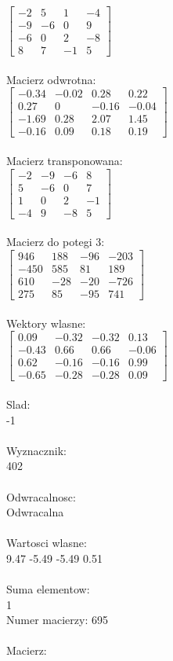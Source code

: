 \documentclass[a4paper,12pt]{article}
\begin{document}
$\begin{bmatrix} -2&5&1&-4\\-9&-6&0&9\\-6&0&2&-8\\8&7&-1&5 \end{bmatrix}$
\\
\\
Macierz odwrotna:\\

$\begin{bmatrix} -0.34&-0.02&0.28&0.22\\0.27&0&-0.16&-0.04\\-1.69&0.28&2.07&1.45\\-0.16&0.09&0.18&0.19 \end{bmatrix}$
\\
\\
Macierz transponowana:\\

$\begin{bmatrix} -2&-9&-6&8\\5&-6&0&7\\1&0&2&-1\\-4&9&-8&5 \end{bmatrix}$
\\
\\
Macierz do potegi 3:\\

$\begin{bmatrix} 946&188&-96&-203\\-450&585&81&189\\610&-28&-20&-726\\275&85&-95&741 \end{bmatrix}$
\\
\\
Wektory wlasne:\\

$\begin{bmatrix} 0.09&-0.32&-0.32&0.13\\-0.43&0.66&0.66&-0.06\\0.62&-0.16&-0.16&0.99\\-0.65&-0.28&-0.28&0.09 \end{bmatrix}$
\\
\\
Slad:\\
-1
\\
\\
Wyznacznik:\\
402
\\
\\
Odwracalnosc:\\
Odwracalna
\\
\\
Wartosci wlasne:\\
9.47 -5.49 -5.49 0.51
\\
\\
Suma elementow:\\
1
\\
\newpage
Numer macierzy:
695
\\
\\
Macierz:\\
\end{document}
